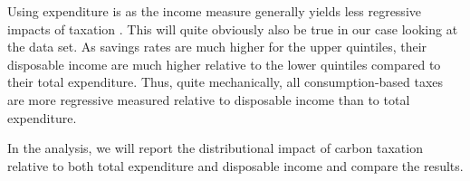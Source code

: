 Using expenditure is as the income measure generally yields less regressive impacts of taxation \citep{meta_carbontax}. This will quite obviously also be true in our case looking at the data set. As savings rates are much higher for the upper quintiles, their disposable income are much higher relative to the lower quintiles compared to their total expenditure. Thus, quite mechanically, all consumption-based taxes are more regressive measured relative to disposable income than to total expenditure.


In the analysis, we will report the distributional impact of carbon taxation relative to both total expenditure and disposable income and compare the results. 












